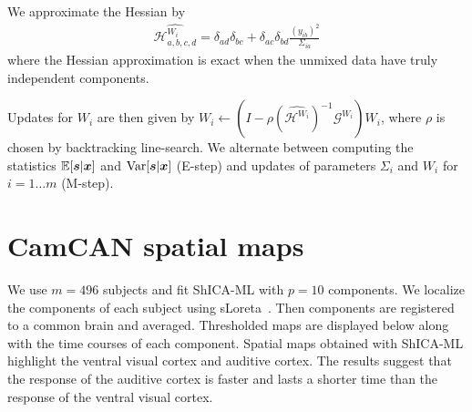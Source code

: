  We approximate the Hessian by
 \begin{align}
 \widehat{\mathcal{H}^{W_i}_{a, b, c, d}} = \delta_{ad} \delta_{bc} + \delta_{ac} \delta_{bd}\frac{(y_{ib})^2}{\Sigma_{ia}}
\end{align}
where the Hessian approximation is exact when the unmixed data have truly independent components.

Updates for $W_i$ are then given by
$W_i \leftarrow (I - \rho (\widehat{\mathcal{H}^{W_i}})^{-1} \mathcal{G}^{W_i}) W_i$, 
where $\rho$ is chosen by backtracking line-search.
We alternate between computing the statistics $\mathbb{E}[\boldsymbol{s}|\boldsymbol{x}]$ and
$\operatorname*{Var}[\boldsymbol{s}|\boldsymbol{x}]$ (E-step) and updates of parameters $\Sigma_i$ and $W_i$ for $i=1 \dots m$ (M-step).





\section{CamCAN spatial maps}
\label{app:shica:maps}
We use $m=496$ subjects and fit ShICA-ML with $p=10$ components. We localize the
components of each subject using sLoreta~\cite{pascual2002standardized}. Then
components are registered to a common brain and averaged. Thresholded maps are
displayed below along with the time courses of each component. Spatial maps obtained with ShICA-ML highlight the ventral visual cortex and auditive cortex. The results suggest that the response of the auditive cortex is faster and lasts a shorter time than the response of the ventral visual cortex.


